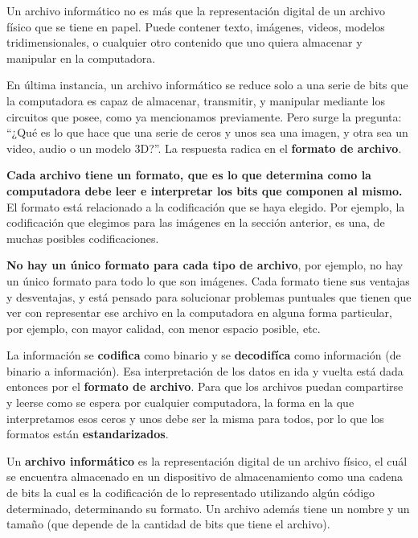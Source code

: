 Un archivo informático no es más que la representación digital de un archivo
físico que se tiene en papel. Puede contener texto, imágenes, videos, modelos
tridimensionales, o cualquier otro contenido que uno quiera almacenar y
manipular en la computadora.

En última instancia, un archivo informático se reduce solo a una serie de bits
que la computadora es capaz de almacenar, transmitir, y manipular mediante los
circuitos que posee, como ya mencionamos previamente. Pero surge la pregunta:
``¿Qué es lo que hace que una serie de ceros y unos sea una imagen, y otra sea
un video, audio o un modelo 3D?''. La respuesta radica en el \textbf{formato de
archivo}.

\textbf{Cada archivo tiene un formato, que es lo que determina como la
computadora debe leer e interpretar los bits que componen al mismo.} El formato
está relacionado a la codificación que se haya elegido. Por ejemplo, la
codificación que elegimos para las imágenes en la sección anterior, es una, de
muchas posibles codificaciones.

\textbf{No hay un único formato para cada tipo de archivo}, por ejemplo, no hay
un único formato para todo lo que son imágenes. Cada formato tiene sus ventajas
y desventajas, y está pensado para solucionar problemas puntuales que tienen que
ver con representar ese archivo en la computadora en alguna forma particular,
por ejemplo, con mayor calidad, con menor espacio posible, etc.

La información se \textbf{codifica} como binario y se \textbf{decodifíca} como
información (de binario a información). Esa interpretación de los datos en ida y
vuelta está dada entonces por el \textbf{formato de archivo}. Para que los
archivos puedan compartirse y leerse como se espera por cualquier computadora,
la forma en la que interpretamos esos ceros y unos debe ser la misma para todos,
por lo que los formatos están \textbf{estandarizados}.

\begin{definition} Un \textbf{archivo informático} es la
    representación digital de un archivo físico, el cuál se encuentra almacenado
    en un dispositivo de almacenamiento como una cadena de bits la cual es la
    codificación de lo representado utilizando algún código determinado,
    determinando su formato. Un archivo además tiene un nombre y un tamaño (que
    depende de la cantidad de bits que tiene el archivo).\autocite[vid.
    p.13]{gookin_2005}
\end{definition}

